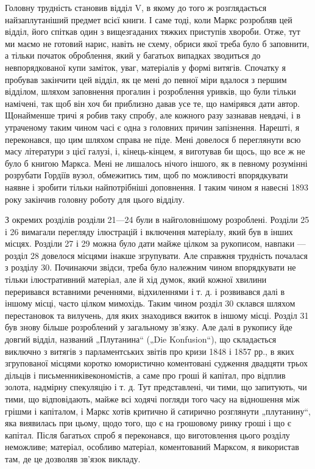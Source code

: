 
Головну трудність становив відділ V, в якому до того ж
розглядається найзаплутаніший предмет всієї книги. І саме тоді,
коли Маркс розробляв цей відділ, його спіткав один з вищезгаданих
тяжких приступів хвороби. Отже, тут ми маємо не готовий
нарис, навіть не схему, обриси якої треба було б заповнити,
а тільки початок оброблення, який у багатьох випадках зводиться
до невпорядкованої купи заміток, уваг, матеріалів у формі
витягів. Спочатку я пробував закінчити цей відділ, як це мені
до певної міри вдалося з першим відділом, шляхом заповнення
прогалин і розроблення уривків, що були тільки намічені, так щоб
він хоч би приблизно давав усе те, що намірявся дати автор. Щонайменше
тричі я робив таку спробу, але кожного разу зазнавав
невдачі, і в утраченому таким чином часі є одна з головних причин
запізнення. Нарешті, я переконався, що цим шляхом справа
не піде. Мені довелося б переглянути всю масу літератури з цієї
галузі, і, кінець-кінцем, я виготував би щось, що все ж не було б
книгою Маркса. Мені не лишалось нічого іншого, як в певному
розумінні розрубати Гордіїв вузол, обмежитись тим, щоб по
можливості впорядкувати наявне і зробити тільки найпотрібніші
доповнення. І таким чином я навесні 1893 року закінчив головну
роботу для цього відділу.

З окремих розділів розділи 21—24 були в найголовнішому
розроблені. Розділи 25 і 26 вимагали перегляду ілюстрацій і
включення матеріалу, який був в інших місцях. Розділи 27 і 29 можна
було дати майже цілком за рукописом, навпаки — розділ 28 довелося
місцями інакше згрупувати. Але справжня трудність почалася
з розділу 30. Починаючи звідси, треба було належним чином
впорядкувати не тільки ілюстративний матеріал, але й хід думок,
який кожної хвилини переривався вставними реченнями, відхиленнями
і т. д. і розвивався далі в іншому місці, часто цілком мимохідь.
Таким чином розділ 30 склався шляхом перестановок та вилучень,
для яких знаходився вжиток в іншому місці. Розділ 31 був знову
більше розроблений у загальному зв’язку. Але далі в рукопису
йде довгий відділ, названий „Плутанина“ („Die Konfusion“), що
складається виключно з витягів з парламентських звітів про кризи
1848 і 1857 рр., в яких згрупованої місцями коротко юмористично
коментовані судження двадцяти трьох дільців і письменниківекономістів,
а саме про гроші й капітал, про відплив золота, надмірну
спекуляцію і т. д. Тут представлені, чи тими, що запитують,
чи тими, що відповідають, майже всі ходячі погляди того
часу на відношення між грішми і капіталом, і Маркс хотів критично
й сатирично розглянути „плутанину“, яка виявилась при цьому,
щодо того, що є на грошовому ринку гроші і що є капітал.
Після багатьох спроб я переконався, що виготовлення цього
розділу неможливе; матеріал, особливо матеріал, коментований
Марксом, я використав там, де це дозволяв зв’язок викладу.


